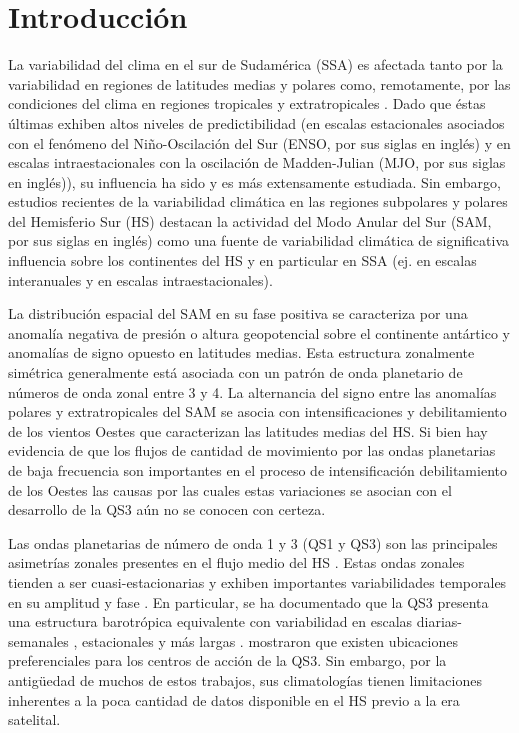 \documentclass[spanish,a4paper,12pt,oneside]{book}
\begin{document}
\restoregeometry
\setcounter{tocdepth}{3} \tableofcontents

\listoffigures
\newpage

\mainmatter

\chapter{Introducción}\label{introduccion}

La variabilidad del clima en el sur de Sudamérica (SSA) es afectada
tanto por la variabilidad en regiones de latitudes medias y polares
como, remotamente, por las condiciones del clima en regiones tropicales
y extratropicales \autocite[ej.][]{Vera2006}. Dado que éstas últimas
exhiben altos niveles de predictibilidad (en escalas estacionales
asociados con el fenómeno del Niño-Oscilación del Sur (ENSO, por sus
siglas en inglés) y en escalas intraestacionales con la oscilación de
Madden-Julian (MJO, por sus siglas en inglés)), su influencia ha sido y
es más extensamente estudiada. Sin embargo, estudios recientes de la
variabilidad climática en las regiones subpolares y polares del
Hemisferio Sur (HS) destacan la actividad del Modo Anular del Sur (SAM,
por sus siglas en inglés) como una fuente de variabilidad climática de
significativa influencia sobre los continentes del HS y en particular en
SSA (ej. \textcite{Silvestri2009} en escalas interanuales y
\textcite{Alvarez2014} en escalas intraestacionales).

La distribución espacial del SAM en su fase positiva se caracteriza por
una anomalía negativa de presión o altura geopotencial sobre el
continente antártico y anomalías de signo opuesto en latitudes medias.
Esta estructura zonalmente simétrica generalmente está asociada con un
patrón de onda planetario de números de onda zonal entre 3 y 4. La
alternancia del signo entre las anomalías polares y extratropicales del
SAM se asocia con intensificaciones y debilitamiento de los vientos
Oestes que caracterizan las latitudes medias del HS. Si bien hay
evidencia de que los flujos de cantidad de movimiento por las ondas
planetarias de baja frecuencia son importantes en el proceso de
intensificación debilitamiento de los Oestes
\autocites{Lorenz2001}{Simpson2013} las causas por las cuales estas
variaciones se asocian con el desarrollo de la QS3 aún no se conocen con
certeza.

Las ondas planetarias de número de onda 1 y 3 (QS1 y QS3) son las
principales asimetrías zonales presentes en el flujo medio del HS
\autocites{Loon1972}{Trenberth1980a}. Estas ondas zonales tienden a ser
cuasi-estacionarias y exhiben importantes variabilidades temporales en
su amplitud y fase \autocite{Loon1972}. En particular, se ha documentado
que la QS3 presenta una estructura barotrópica equivalente con
variabilidad en escalas diarias-semanales \autocite{Kidson1988},
estacionales \autocite{Mo1985} y más largas \autocite{Karoly1989}.
\textcite{Mo1985} mostraron que existen ubicaciones preferenciales para
los centros de acción de la QS3. Sin embargo, por la antigüedad de
muchos de estos trabajos, sus climatologías tienen limitaciones
inherentes a la poca cantidad de datos disponible en el HS previo a la
era satelital.
\end{document}

